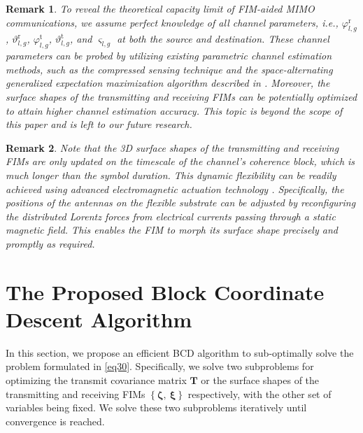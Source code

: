 \documentclass[lettersize,journal]{IEEEtran}
\newtheorem{remark}{\textbf{Remark}}
\begin{document}
\begin{remark}
To reveal the theoretical capacity limit of FIM-aided MIMO communications, we assume perfect knowledge of all channel parameters, i.e., $\varphi_{l,g}^{\textrm{r}}$, $\vartheta_{l,g}^{\textrm{r}}$, $\varphi_{l,g}^{\textrm{t}}$, $\vartheta_{l,g}^{\textrm{t}}$, and $\varsigma _{l,g}$ at both the source and destination. These channel parameters can be probed by utilizing existing parametric channel estimation methods, such as the compressed sensing technique and the space-alternating generalized expectation maximization algorithm described in \cite{TWC_2018_Shahmansoori_Position, TWC_2023_An_Fundamental}. Moreover, the surface shapes of the transmitting and receiving FIMs can be potentially optimized to attain higher channel estimation accuracy. This topic is beyond the scope of this paper and is left to our future research.
\end{remark}


\begin{remark}
Note that the 3D surface shapes of the transmitting and receiving FIMs are only updated on the timescale of the channel's coherence block, which is much longer than the symbol duration. This dynamic flexibility can be readily achieved using advanced electromagnetic actuation technology \cite{Nature_2022_Bai_A}. Specifically, the positions of the antennas on the flexible substrate can be adjusted by reconfiguring the distributed Lorentz forces from electrical currents passing through a static magnetic field. This enables the FIM to morph its surface shape precisely and promptly as required.
\end{remark}



\section{The Proposed Block Coordinate Descent Algorithm}\label{sec3}
In this section, we propose an efficient BCD algorithm to sub-optimally solve the problem formulated in \eqref{eq30}. Specifically, we solve two subproblems for optimizing the transmit covariance matrix $\mathbf{T}$ or the surface shapes of the transmitting and receiving FIMs $\left \{ \boldsymbol{\zeta},\ \boldsymbol{\xi} \right \}$ respectively, with the other set of variables being fixed. We solve these two subproblems iteratively until convergence is reached.
\end{document}
